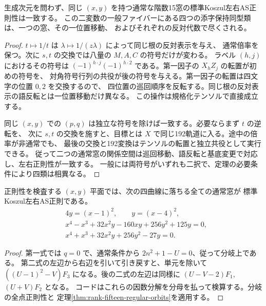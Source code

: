 \begin{corollary}\label{cor:rank-fifteen-regularity-quotient}
生成次元を問わず、同じ $(x,y)$ を持つ通常な階数15窓の標準Koszul左右AS正則性は一致する。
この二変数の一般ファイバーにある四つの添字保持同型類は、一つの窓、その一位置移動、
およびそれぞれの反対代数で尽くされる。
\end{corollary}
\begin{proof}
$t\mapsto1/t$ は $\lambda\mapsto1/(z\lambda)$ によって同じ根の反対表示を与え、
通常倍率を保つ。次に $s,t$ の交換では八量の $M,A,C$ の符号だけが変わる。
ラベル $(h,j)$ におけるその符号は
$(-1)^{h\cdot j}(-1)^{h\cdot 2}$ である。第一因子の $X_hZ_j$ の転置が初めの符号を、
対角符号行列の共役が後の符号を与える。第一因子の転置は四文字の位置 $0,2$ を交換するので、
四位置の巡回順序を反転する。同じ根の反対表示の語反転とは一位置移動だけ異なる。
この操作は規格化テンソルで直接成立する。

同じ $(x,y)$ での $(p,q)$ は独立な符号を除けば一致する。必要ならまず $t$ の逆転を、
次に $s,t$ の交換を施すと、目標とは $X$ で同じ192軌道に入る。途中の倍率が非通常でも、
最後の交換と192変換はテンソルの転置と独立共役として実行できる。
従って二つの通常窓の関係空間は巡回移動、語反転と基底変更で対応し、左右正則性が一致する。
一般には両符号がいずれも二択で、定理の必要条件により四類は相異なる。
\end{proof}

\begin{corollary}
正則性を検査する $(x,y)$ 平面では、次の四曲線に落ちる全ての通常窓が
標準Koszul左右AS正則である。
\[
\begin{aligned}
 &4y=(x-1)^2,\qquad y=(x-4)^2,\\
 &x^4-x^3+32x^2y-160xy+256y^2+125y=0,\\
 &x^4+x^3+32x^2y+256y^2-27y=0 .
\end{aligned}
\]
\end{corollary}
\begin{proof}
第一式では $q=0$ で、通常条件から $2n^2+1-U=0$、従って分岐上である。
第二式の左辺から右辺を引いて引き戻すと、単元を除いて
$((U-1)^2-V)F_3$ になる。後の二式の左辺は同様に
$(U-V-2)F_1$, $(U+V)F_2$ となる。
コードはこれらの因数分解を分母を払って検算する。分岐の全点正則性と
定理\ref{thm:rank-fifteen-regular-orbits}を適用する。
\end{proof}
